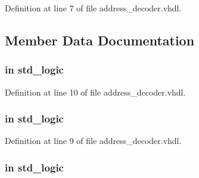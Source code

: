 Definition at line 7 of file address\+\_\+decoder.\+vhdl.



\subsection{Member Data Documentation}
\subsubsection[{\texorpdfstring{a10}{a10}}]{ {\bfseries \textcolor{keywordflow}{in}\textcolor{vhdlchar}{ }} {\bfseries \textcolor{comment}{std\+\_\+logic}\textcolor{vhdlchar}{ }} \hspace{0.3cm}{\ttfamily [Port]}}\hypertarget{classaddress__decoder_acd015df1a3bf79033001ea825f46afb0}{}\label{classaddress__decoder_acd015df1a3bf79033001ea825f46afb0}


Definition at line 10 of file address\+\_\+decoder.\+vhdl.

\subsubsection[{\texorpdfstring{a11}{a11}}]{ {\bfseries \textcolor{keywordflow}{in}\textcolor{vhdlchar}{ }} {\bfseries \textcolor{comment}{std\+\_\+logic}\textcolor{vhdlchar}{ }} \hspace{0.3cm}{\ttfamily [Port]}}\hypertarget{classaddress__decoder_a437e5699fd8034e3f753abeedaea13f1}{}\label{classaddress__decoder_a437e5699fd8034e3f753abeedaea13f1}


Definition at line 9 of file address\+\_\+decoder.\+vhdl.

\subsubsection[{\texorpdfstring{a8}{a8}}]{ {\bfseries \textcolor{keywordflow}{in}\textcolor{vhdlchar}{ }} {\bfseries \textcolor{comment}{std\+\_\+logic}\textcolor{vhdlchar}{ }} \hspace{0.3cm}{\ttfamily [Port]}}\hypertarget{classaddress__decoder_ac954cc9f3cb642d4a50e8c9124bf3e0d}{}\label{classaddress__decoder_ac954cc9f3cb642d4a50e8c9124bf3e0d}


